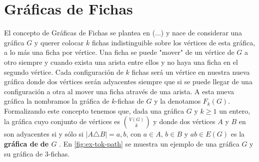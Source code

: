 \section{Gr\'aficas de Fichas}
\label{def:fichas}

El concepto de Gr\'aficas de Fichas se plantea en (...) y nace de considerar una
gr\'afica $G$ y querer colocar $k$ fichas indistinguible sobre los v\'ertices de
esta gr\'afica, a lo m\'as una ficha por v\'ertice. Una ficha se puede "mover"
de un v\'ertice de $G$ a otro siempre y cuando exista una arista entre ellos y
no haya una ficha en el segundo v\'ertice. Cada configuraci\'on de $k$ fichas
ser\'a un v\'ertice en nuestra nueva gr\'afica donde dos v\'ertices ser\'an
adyacentes siempre que si se puede llegar de una configuraci\'on a otra al mover
una ficha atrav\'es de una arista. A esta nueva gr\'afica la nombramos la
gr\'afica de $k$-fichas de $G$ y la denotamos $F_k(G)$. Formalizando este
concepto tenemos que, dada una gr\'afica $G$ y $k \geq 1$ un entero, la
gr\'afica cuyo conjunto de v\'ertices es $\binom{V(G)}{k}$ y donde dos
v\'ertices $A$ y $B$ en son adyacentes si y s\'olo si $|A \triangle B| ={a,b}$,
con $a \in A$, $b \in B$ y $ab \in E(G)$ es la \textbf{gr\'afica de}
 \textbf{de $G$} . En \cref{fig:ex-tok-path} se muestra
un ejemplo de una gr\'afica $G$ y su gr\'afica de $3$-fichas.

